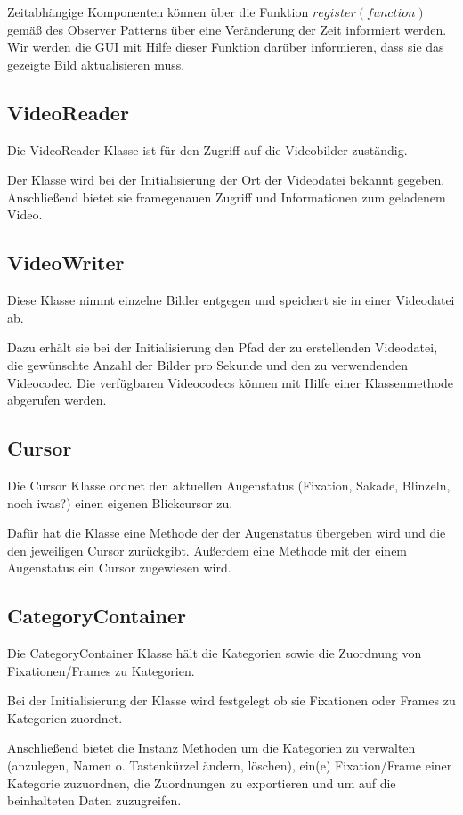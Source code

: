 \documentclass[a4paper,draft]{scrartcl}
\begin{document}
Zeitabh\"angige Komponenten k\"onnen \"uber die Funktion $register(function)$ gem\"aß des Observer Patterns \"uber eine Ver\"anderung der Zeit informiert werden.
Wir werden die GUI mit Hilfe dieser Funktion dar\"uber informieren, dass sie das gezeigte Bild aktualisieren muss.

\subsection{VideoReader}
Die VideoReader Klasse ist f\"ur den Zugriff auf die Videobilder zust\"andig.

Der Klasse wird bei der Initialisierung der Ort der Videodatei bekannt gegeben.
Anschließend bietet sie framegenauen Zugriff und Informationen zum geladenem Video.

\subsection{VideoWriter}
Diese Klasse nimmt einzelne Bilder entgegen und speichert sie in einer Videodatei ab.

Dazu erhält sie bei der Initialisierung den Pfad der zu erstellenden Videodatei, die gewünschte Anzahl der Bilder pro Sekunde und den zu verwendenden Videocodec.
Die verfügbaren Videocodecs können mit Hilfe einer Klassenmethode abgerufen werden.

\subsection{Cursor}
Die Cursor Klasse ordnet den aktuellen Augenstatus (Fixation, Sakade, Blinzeln, noch iwas?) einen eigenen Blickcursor zu.

Dafür hat die Klasse eine Methode der der Augenstatus übergeben wird und die den jeweiligen Cursor zurückgibt. Außerdem eine Methode mit der einem Augenstatus ein Cursor zugewiesen wird.

\subsection{CategoryContainer}
Die CategoryContainer Klasse hält die Kategorien sowie die Zuordnung von Fixationen/Frames zu Kategorien.

Bei der Initialisierung der Klasse wird festgelegt ob sie Fixationen oder Frames zu Kategorien zuordnet.

Anschließend bietet die Instanz Methoden um die Kategorien zu verwalten (anzulegen, Namen o. Tastenkürzel ändern, löschen), ein(e) Fixation/Frame einer Kategorie zuzuordnen, die Zuordnungen zu exportieren und um auf die beinhalteten Daten zuzugreifen.
\end{document}

